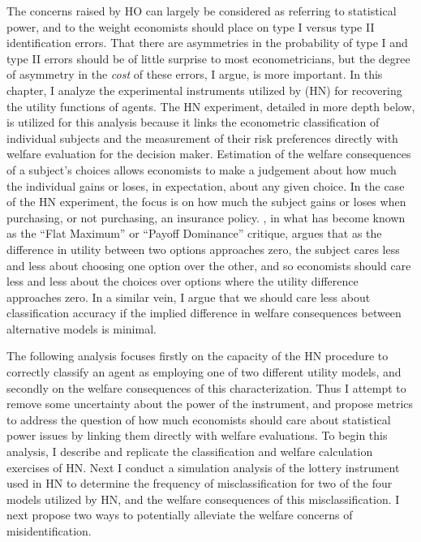 \documentclass[../main.tex]{subfiles}
\begin{document}
The concerns raised by HO can largely be considered as referring to statistical power, and to the weight economists should place on type I versus type II identification errors.
That there are asymmetries in the probability of type I and type II errors should be of little surprise to most econometricians, but the degree of asymmetry in the \textit{cost} of these errors, I argue, is more important.
In this chapter, I analyze the experimental instruments utilized by \textcite{Harrison2016} (HN) for recovering the utility functions of agents.
The HN experiment, detailed in more depth below, is utilized for this analysis because it links the econometric classification of individual subjects and the measurement of their risk preferences directly with welfare evaluation for the decision maker.
Estimation of the welfare consequences of a subject's choices allows economists to make a judgement about how much the individual gains or loses, in expectation, about any given choice.
In the case of the HN experiment, the focus is on how much the subject gains or loses when purchasing, or not purchasing, an insurance policy.
\textcite{Harrison1989, Harrison1992}, in what has become known as the \enquote{Flat Maximum} or \enquote{Payoff Dominance} critique, argues that as the difference in utility between two options approaches zero, the subject cares less and less about choosing one option over the other, and so economists should care less and less about the choices over options where the utility difference approaches zero.
In a similar vein, I argue that we should care less about classification accuracy if the implied difference in welfare consequences between alternative models is minimal.

The following analysis focuses firstly on the capacity of the HN procedure to correctly classify an agent as employing one of two different utility models, and secondly on the welfare consequences of this characterization.
Thus I attempt to remove some uncertainty about the power of the instrument, and propose metrics to address the question of how much economists should care about statistical power issues by linking them directly with welfare evaluations.
To begin this analysis, I describe and replicate the classification and welfare calculation exercises of HN.
Next I conduct a simulation analysis of the lottery instrument used in HN to determine the frequency of misclassification for two of the four models utilized by HN, and the welfare consequences of this misclassification.
I next propose two ways to potentially alleviate the welfare concerns of misidentification.
\end{document}
